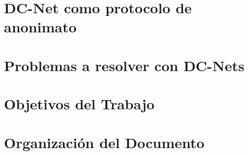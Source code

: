 \section{DC-Net como protocolo de anonimato}
\section{Problemas a resolver con DC-Nets}
\section{Objetivos del Trabajo}
\section{Organización del Documento}